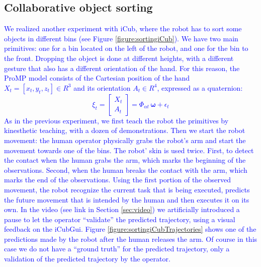 \documentclass[utf8]{frontiersSCNS} %
\newcommand{\rev}[1]{\textcolor{blue}{#1}}
\begin{document}
\subsection{Collaborative object sorting}

\rev{We realized another experiment with iCub, where the robot has to sort some objects in different bins (see Figure \ref{figure:sortingiCub}). We have two main primitives: one for a bin located on the left of the robot, and one for the bin to the front. Dropping the object is done at different heights, with a different gesture that also has a different orientation of the hand. 
For this reason, the ProMP model consists of the Cartesian position of the hand $X_t=[x_t,y_t,z_t] \in R^3$ and its orientation $A_t \in R^4$, expressed as a quaternion:
$$\xi_t = \begin{bmatrix} X_t \\ A_t\end{bmatrix} = \Phi_{\alpha t} \, \boldsymbol{\omega} + \epsilon_t$$
As in the previous experiment, we first teach the robot the primitives by kinesthetic teaching, with a dozen of demonstrations. Then we start the robot movement: the human operator physically grabs the robot's arm and start the movement towards one of the bins. 
The robot' skin is used twice. 
First, to detect the contact when the human grabs the arm, which marks the beginning of the observations. 
Second, when the human breaks the contact with the arm, which marks the end of the observations. 
Using the first portion of the observed movement, the robot recognize the current task that is being executed, predicts the future movement that is intended by the human and then executes it on its own. 
In the video (see link in Section \ref{sec:video}) we artificially introduced  a pause to let the operator ``validate'' the predicted trajectory, using a visual feedback on the iCubGui. 
Figure \ref{figure:sortingiCubTrajectories} shows one of the predictions made by the robot after the human releases the arm. Of course in this case we do not have a ``ground truth'' for the predicted trajectory, only a validation of the predicted trajectory by the operator.}
\end{document}
